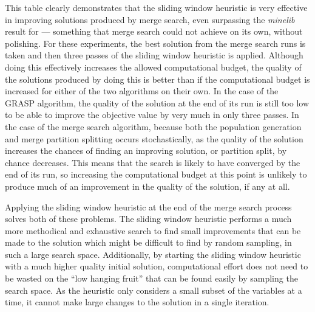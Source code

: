 \documentclass[journal]{IEEEtran}
\begin{document}
This table clearly demonstrates that the sliding window heuristic is very effective in improving solutions produced by merge search, even surpassing the \emph{minelib} result for \zucklarge{} --- something that merge search could not achieve on its own, without polishing. For these experiments, the best solution from the merge search runs is taken and then three passes of the sliding window heuristic is applied. Although doing this effectively increases the allowed computational budget, the quality of the solutions produced by doing this is better than if the computational budget is increased for either of the two algorithms on their own. In the case of the GRASP algorithm, the quality of the solution at the end of its run is still too low to be able to improve the objective value by very much in only three passes. In the case of the merge search algorithm, because both the population generation and merge partition splitting occurs stochastically, as the quality of the solution increases the chances of finding an improving solution, or partition split, by chance decreases. This means that the search is likely to have converged by the end of its run, so increasing the computational budget at this point is unlikely to produce much of an improvement in the quality of the solution, if any at all.

Applying the sliding window heuristic at the end of the merge search process solves both of these problems. The sliding window heuristic performs a much more methodical and exhaustive search to find small improvements that can be made to the solution which might be difficult to find by random sampling, in such a large search space. Additionally, by starting the sliding window heuristic with a much higher quality initial solution, computational effort does not need to be wasted on the ``low hanging fruit'' that can be found easily by sampling the search space. As the heuristic only considers a small subset of the variables at a time, it cannot make large changes to the solution in a single iteration. 
\end{document}
